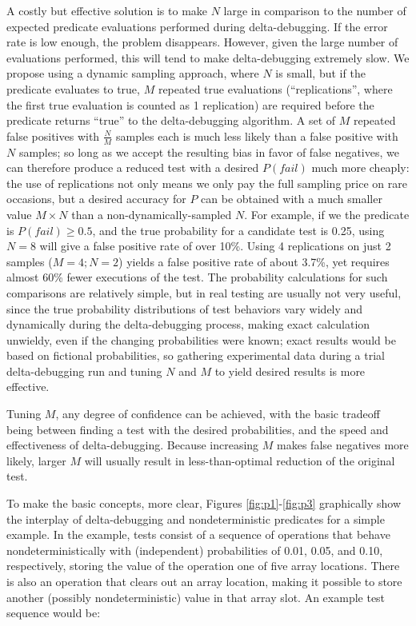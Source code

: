 A costly but effective solution is to make $N$ large in comparison to
the number of expected predicate evaluations performed during
delta-debugging.  If the error rate is low enough, the problem
disappears.  However, given the large number of evaluations performed,
this will tend to make delta-debugging extremely slow.  We propose
using a dynamic sampling approach, where $N$ is small, but if the
predicate evaluates to true, $M$ repeated true evaluations
(``replications'', where the first true evaluation is counted as 1 replication) are
required before the predicate returns ``true'' to the delta-debugging
algorithm.  A set of $M$ repeated false positives with
$\frac{N}{M}$ samples each is much less likely than a false positive
with $N$ samples; so long as we accept the resulting bias in favor of
false negatives, we can therefore produce a reduced test with a
desired $P(fail)$ much more cheaply:  the use of replications not only
means we only pay the full sampling price on rare occasions, but a
desired accuracy for $P$ can be obtained with a much smaller value $M
\times N$ than a non-dynamically-sampled $N$.  For example, if we the predicate
is $P(fail) \geq 0.5$, and the true probability for a candidate test
is 0.25, using $N=8$ will give a false positive rate of over 10\%.
Using 4 replications on just 2 samples ($M=4;N=2$) yields a false
positive rate of about 3.7\%, yet requires almost 60\% fewer
executions of the test.  The probability calculations for such comparisons
  are relatively simple, but in real testing are
  usually not very useful, since the true
  probability distributions of test behaviors vary widely and
  dynamically during the
  delta-debugging process, making exact calculation unwieldy, even if
  the changing probabilities were known; exact results would be based on fictional
  probabilities, so gathering experimental data during a trial
  delta-debugging run and tuning $N$ and $M$ to yield desired
  results is  more effective.

Tuning $M$, any degree of confidence can be achieved, with
the basic tradeoff being between finding a test with the desired
probabilities, and the speed and effectiveness of delta-debugging.
Because increasing $M$ makes false negatives more likely, larger $M$
will usually result in less-than-optimal reduction of the original
test.



To make the basic concepts, more clear, Figures
\ref{fig:p1}-\ref{fig:p3} graphically show the interplay of
delta-debugging and nondeterministic predicates for a simple example.
In the example, tests consist of a sequence of operations that behave
nondeterministically with (independent) probabilities of 0.01, 0.05,
and 0.10, respectively, storing the value of the operation one of five array locations.
There is also an operation that clears out an array location, making
it possible to store another (possibly nondeterministic) value in that
array slot.  An example test sequence would be:


